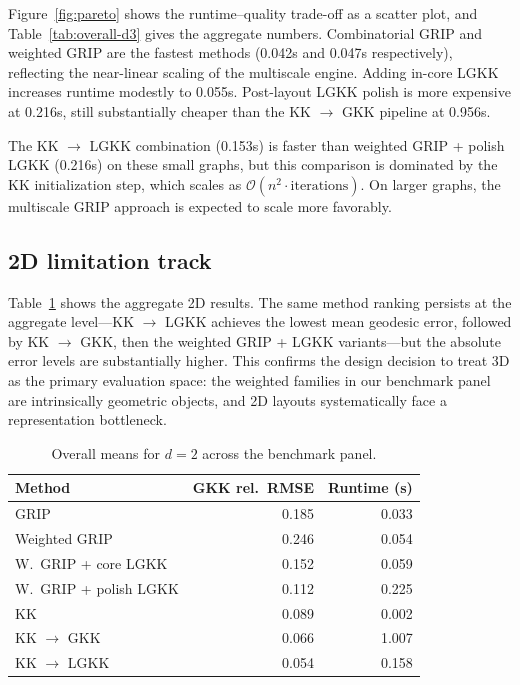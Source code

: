 \documentclass[11pt,twocolumn]{article}
\newcommand{\bigO}{\mathcal{O}}
\begin{document}
Figure~\ref{fig:pareto} shows the runtime--quality trade-off as a
scatter plot, and Table~\ref{tab:overall-d3} gives the aggregate
numbers.
Combinatorial GRIP and weighted GRIP are the fastest methods (0.042s and
0.047s respectively), reflecting the near-linear scaling of the
multiscale engine.  Adding in-core LGKK increases runtime modestly to
0.055s.  Post-layout LGKK polish is more expensive at 0.216s, still
substantially cheaper than the KK $\to$ GKK pipeline at 0.956s.

The KK $\to$ LGKK combination (0.153s) is faster than weighted GRIP +
polish LGKK (0.216s) on these small graphs, but this comparison is
dominated by the KK initialization step, which scales as
$\bigO(n^2 \cdot \text{iterations})$.  On larger graphs, the multiscale
GRIP approach is expected to scale more favorably.

\subsection{2D limitation track}

Table~\ref{tab:overall-d2} shows the aggregate 2D results.  The same
method ranking persists at the aggregate level---KK $\to$ LGKK achieves
the lowest mean geodesic error, followed by KK $\to$ GKK, then the
weighted GRIP + LGKK variants---but the absolute error levels are
substantially higher.  This confirms the design decision to treat 3D as
the primary evaluation space: the weighted families in our benchmark
panel are intrinsically geometric objects, and 2D layouts systematically
face a representation bottleneck.

\begin{table}[t]
\centering
\caption{Overall means for $d = 2$ across the benchmark panel.}
\label{tab:overall-d2}
\small
\begin{tabular}{lrr}
\toprule
Method & GKK rel.\ RMSE & Runtime (s) \\
\midrule
GRIP                       & 0.185 & 0.033 \\
Weighted GRIP              & 0.246 & 0.054 \\
W.\ GRIP + core LGKK      & 0.152 & 0.059 \\
W.\ GRIP + polish LGKK    & 0.112 & 0.225 \\
KK                         & 0.089 & 0.002 \\
KK $\to$ GKK              & 0.066 & 1.007 \\
KK $\to$ LGKK             & 0.054 & 0.158 \\
\bottomrule
\end{tabular}
\end{table}
\end{document}
